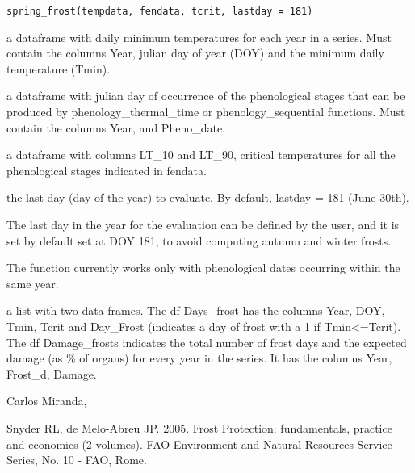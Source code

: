 \documentclass[a4paper]{book}
\begin{document}
%
\begin{Usage}
\begin{verbatim}
spring_frost(tempdata, fendata, tcrit, lastday = 181)
\end{verbatim}
\end{Usage}
%
\begin{Arguments}
\begin{ldescription}
\item[\code{tempdata}] a dataframe with daily minimum temperatures for each
year in a series. Must contain the columns Year, julian day of year (DOY) and
the minimum daily temperature (Tmin).

\item[\code{fendata}] a dataframe with julian day of occurrence of the phenological
stages that can be produced by phenology\_thermal\_time or phenology\_sequential 
functions. Must contain the columns Year, and Pheno\_date.

\item[\code{tcrit}] a dataframe with columns LT\_10 and LT\_90,  critical temperatures 
for all the  phenological stages indicated in fendata.

\item[\code{lastday}] the last day (day of the year) to evaluate. By default, 
lastday = 181 (June 30th).
\end{ldescription}
\end{Arguments}
%
\begin{Details}\relax
The last day in the year for the evaluation can be defined by the user, 
and it is set by default set at DOY 181, to avoid computing autumn 
and winter frosts.

The function currently works only with phenological dates occurring
within the same year.
\end{Details}
%
\begin{Value}
a list with two data frames. The df Days\_frost has the columns Year, DOY, 
Tmin, Tcrit and Day\_Frost (indicates a day of frost with a 1 if Tmin<=Tcrit). 
The df Damage\_frosts indicates the total number of frost days and the expected 
damage (as \% of organs) for every year in the series. It has the columns 
Year, Frost\_d, Damage.
\end{Value}
%
\begin{Author}\relax
Carlos Miranda, 
\end{Author}
%
\begin{References}\relax
Snyder RL, de Melo-Abreu JP. 2005. Frost Protection: fundamentals, practice and 
economics (2 volumes). FAO Environment and Natural Resources Service Series, 
No. 10 - FAO, Rome.
\end{References}
\end{document}

